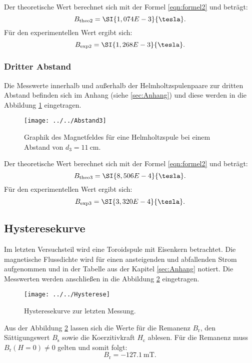 Der theoretische Wert berechnet sich mit der Formel \ref{eqn:formel2} und beträgt:
\begin{equation*}
B_{\text{theo2}} = \SI{1,074 E-3}{\tesla}.
\end{equation*}
Für den experimentellen Wert ergibt sich:
\begin{equation*}
B_{\text{exp2}} = \SI{1,268 E-3}{\tesla}.
\end{equation*}

\subsubsection{Dritter Abstand}
Die Messwerte innerhalb und außerhalb der Helmholtzspulenpaare zur dritten Abstand befinden sich im Anhang (siehe \ref{sec:Anhang}) und diese werden in die Abbildung \ref{fig:abstand3} eingetragen. 
\begin{figure}[h!]
	\centering
	\texttt{[image: ../../Abstand3]}
	\caption{Graphik des Magnetfeldes für eine Helmholtzspule bei einem Abstand von $d_{3} = \SI{11}{\cm}$.}
	\label{fig:abstand3}
\end{figure}

Der theoretische Wert berechnet sich mit der Formel \ref{eqn:formel2} und beträgt:
\begin{equation*}
B_{\text{theo3}} = \SI{8,506 E-4}{\tesla}.
\end{equation*}
Für den experimentellen Wert ergibt sich:
\begin{equation*}
B_{\text{exp3}} = \SI{3,320 E-4}{\tesla}.
\end{equation*}

\subsection{Hysteresekurve}
Im letzten Versuchsteil wird eine Toroidspule mit Eisenkern betrachtet. Die magnetische Flussdichte wird für einen ansteigenden und abfallenden Strom aufgenommen und in der Tabelle aus der Kapitel \ref{sec:Anhang} notiert. Die Messwerten werden anschließen in die Abbildung \ref{fig:hysterese} eingetragen.

\begin{figure}[h!]
	\centering
	\texttt{[image: ../../Hysterese]}
	\caption{Hysteresekurve zur letzten Messung.}
	\label{fig:hysterese}
\end{figure}

Aus der Abbildung \ref{fig:hysterese} lassen sich die Werte für die Remanenz $B_{\text{r}}$, den Sättigungswert $B_{\text{s}}$ sowie die Koerzitivkraft $H_{\text{c}}$ ablesen. Für die Remanenz muss $B_{\text{r}} (H=0) \neq 0$ gelten und somit folgt:
\begin{equation*}
B_{\text{r}} = \SI{-127,1}{\milli\tesla}.
\end{equation*}

